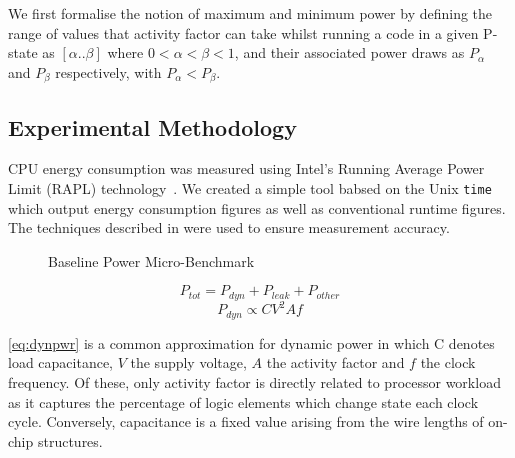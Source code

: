 We first formalise the notion of maximum and minimum power by defining the range of values that activity factor can take whilst running a code in a given P-state as $[\alpha  .. \beta]$ where $0 < \alpha < \beta < 1$, and their associated power draws as $P_{\alpha}$ and $P_{\beta}$ respectively, with $P_{\alpha} < P_{\beta}$. 

\subsection{Experimental Methodology}
CPU energy consumption was measured using Intel's Running Average Power Limit (RAPL) technology~\cite{david:2010aa}.
We created a simple tool babsed on the Unix \texttt{time} which output energy consumption figures as well as conventional runtime figures.
The techniques described in \cite{hackenberg:2013aa} were used to ensure measurement accuracy. 


\begin{figure}[ht]                                                               
\centering                                                                      
\lstset{basicstyle=\ttfamily\footnotesize\bfseries, frame=tb} %
              
\caption{Baseline Power Micro-Benchmark}                            
\label{fig:microbench}                                                           
\end{figure}  


\begin{equation}
\label{eq:totpwr}
P_{tot} = P_{dyn} + P_{leak} + P_{other}
\end{equation}
\begin{equation} 
\label{eq:dynpwr}
P_{dyn} \propto CV^{2}Af
\end{equation}

\autoref{eq:dynpwr} is a common approximation for dynamic power in which C denotes load capacitance, $V$ the supply voltage, $A$ the activity factor and $f$ the clock frequency.
Of these, only activity factor is directly related to processor workload as it captures the percentage of logic elements which change state each clock cycle.
Conversely, capacitance is a fixed value arising from the wire lengths of on-chip structures.


